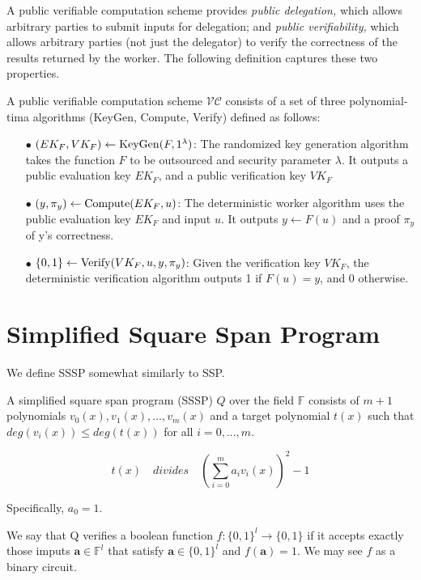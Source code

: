 \documentclass[lnbip]{svmultln}
\begin{document}
A public verifiable computation scheme provides \textit{public delegation,} which allows arbitrary parties to submit inputs for delegation; and \textit{public verifiability,} which allows arbitrary parties (not just the delegator) to verify the correctness of the results returned by the worker.
The following definition captures these two properties.
\begin{definition} 
A public verifiable computation scheme $\mathcal{VC}$ consists of a set of three polynomial-tima algorithms {\rm(KeyGen, Compute, Verify)} defined as follows:
\begin{itemize}
\item[$\bullet$] $(EK_F,VK_F) \leftarrow {\rm KeyGen}(F, 1^\lambda)$: The randomized key generation algorithm takes the function $F$ to be outsourced and security parameter $\lambda$. It outputs a public evaluation key $EK_F$, and a public verification key $VK_F$

\item[$\bullet$] $(y,\pi_y) \leftarrow {\rm Compute}(EK_F,u)$: The deterministic worker algorithm uses the public evaluation key $EK_F$ and input $u$. It outputs $y \leftarrow F(u)$ and a proof $\pi_y$ of y's correctness.

\item[$\bullet$] $\{0,1\} \leftarrow {\rm Verify}(VK_F,u,y,\pi_y)$: Given the verification key $VK_F$, the deterministic verification algorithm outputs 1 if $F(u) = y$, and 0 otherwise.
\end{itemize}

\end{definition}



\section{Simplified Square Span Program}
We define SSSP somewhat similarly to SSP.
\begin{definition}
A simplified square span program (SSSP) $Q$ over the field $\mathbb{F}$ consists of $m+1$ polynomials $v_0(x),v_1(x),...,v_m(x)$ and a target polynomial $t(x)$ such that $deg(v_i(x)) \leq deg(t(x)) $ for all $i=0,...,m$.

$$t(x) \quad divides\quad \left(\sum\limits_{i=0}^ma_i v_i(x)\right)^2-1$$

Specifically, $a_0=1$. 

We say that Q verifies a boolean function $f:\{0,1\}^l \rightarrow \{0,1\}$ if it accepts exactly those imputs $\textbf{a} \in \mathbb{F}^l$ that satisfy $\textbf{a} \in \{0,1\}^l$ and $f(\textbf{a})=1$. We may see $f$ as a binary circuit.

\end{definition}
\end{document}
